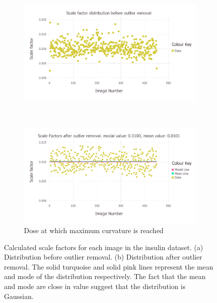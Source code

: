 \begin{figure}
    \centering
    \begin{subfigure}[b]{1.0\textwidth}
            \centering
            \includegraphics[width=\textwidth]{figures/datared/ScaleFac_Plot_Before_outlier_removal.pdf}
            \caption{}
            \label{fig:Scale factors per image before outlier removal - insulin}
    \end{subfigure}
    \\
    \begin{subfigure}[b]{1.0\textwidth}
            \centering
            \includegraphics[width=\textwidth]{figures/datared/ScaleFac_Plot_After_outlier_removal.pdf}
            \caption{Dose at which maximum curvature is reached}
            \label{fig:Scale factors per image after outlier removal - insulin}
    \end{subfigure}
    \caption{Calculated scale factors for each image in the insulin dataset.
    (a) Distribution before outlier removal.
    (b) Distribution after outlier removal.
    The solid turquoise and solid pink lines represent the mean and mode of the distribution respectively.
    The fact that the mean and mode are close in value suggest that the distribution is Gaussian.}
    \label{fig:Scale factors per image - insulin}
\end{figure}

